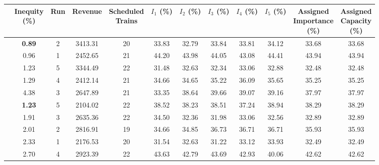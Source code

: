 \documentclass[preprint,12pt]{elsarticle}
\begin{document}
\begin{table}[htbp]
\centering
\begin{adjustbox}{max width=\textwidth}
\begin{tabular}{|c|c|c|c|c|c|c|c|c|c|c|c|}
\cline{2-12}
 \multicolumn{1}{c|}{} & \makecell{\textbf{Inequity} \\ \textbf{(\%)}} & \textbf{Run} & \textbf{Revenue} & \makecell{\textbf{Scheduled} \\ \textbf{Trains}} & \makecell{\textbf{$I_1$} \\ \textbf{(\%)}} & \makecell{\textbf{$I_2$}  \\ \textbf{(\%)}} & \makecell{\textbf{$I_3$}  \\ \textbf{(\%)}} & \makecell{\textbf{$I_4$} \\ \textbf{(\%)}} & \makecell{\textbf{$I_5$} \\ \textbf{(\%)}} & \makecell{\textbf{Assigned} \\ \textbf{Importance} \\ \textbf{(\%)}} & \makecell{\textbf{Assigned} \\ \textbf{Capacity} \\ \textbf{(\%)}} \\ \cline{2-12} \hline

\parbox[t]{2mm}{} & \textbf{0.89} & 2 & 3413.31 & 20 & 33.83 & 32.79 & 33.84 & 33.81 & 34.12 & 33.68 & 33.68 \\ 
& 0.96 & 1 & 2452.65 & 21 & 44.20 & 43.98 & 44.05 & 43.08 & 44.41 & 43.94 & 43.94 \\ 
& 1.23 & 5 & 3344.49 & 22 & 31.48 & 32.63 & 32.34 & 33.06 & 32.88 & 32.48 & 32.48 \\ 
& 1.29 & 4 & 2412.14 & 21 & 34.66 & 34.65 & 35.22 & 36.09 & 35.65 & 35.25 & 35.25 \\ 
& 4.38 & 3 & 2647.89 & 21 & 33.35 & 38.64 & 39.66 & 39.07 & 39.16 & 37.97 & 37.97 \\ \hline

\parbox[t]{2mm}{} & \textbf{1.23} & 5 & 2104.02 & 22 & 38.52 & 38.23 & 38.51 & 37.24 & 38.94 & 38.29 & 38.29 \\ 
& 1.91 & 3 & 2635.36 & 22 & 34.50 & 32.36 & 31.98 & 33.06 & 32.56 & 32.89 & 32.89 \\
& 2.01 & 2 & 2816.91 & 19 & 34.66 & 34.85 & 36.73 & 36.71 & 36.71 & 35.93 & 35.93 \\ 
& 2.33 & 1 & 2176.53 & 20 & 31.54 & 32.63 & 31.22 & 33.12 & 33.93 & 32.49 & 32.49 \\ 
& 2.70 & 4 & 2923.39 & 22 & 43.63 & 42.79 & 43.69 & 42.93 & 40.06 & 42.62 & 42.62 \\ \hline


\end{tabular}
\end{adjustbox}
\end{table}
\end{document}
